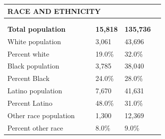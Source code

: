 \documentclass[9pt]{report}
\begin{document}
\vspace{12pt}
\setlength{\tabcolsep}{.01in} %
\begin{tabular}{p{.10in}p{.10in}p{.10in}p{3.7in}>{\hfill}p{.85in}>{\hfill}p{.85in}>{\hfill}p{.85in}>{\hfill}p{.85in}p{0.1in}}
\multicolumn{9}{l}{\parbox{7.1in}{\raggedright{\large{\strut\textbf{RACE AND ETHNICITY}\strut}}}} \\ 
\hline
\multicolumn{4}{l}{\parbox{3.5in}{\raggedright{\textbf{}}}} & \multicolumn{1}{r}{\parbox{.85in}{\strut\raggedleft{\textbf{}\strut}}} & \multicolumn{1}{r}{\parbox{.85in}{\strut\raggedleft{\textbf{}\strut}}} & \multicolumn{1}{r}{\parbox{.85in}{\strut{}}} & \multicolumn{1}{r}{\parbox{.85in}{\strut{}}} & \\ 
\multicolumn{9}{l}{} \\ 
\multicolumn{4}{l}{\parbox{3.5in}{\strut\raggedright{\textbf{Total population}\strut}}} & \textbf{} & \textbf{} & \textbf{15,818} & \textbf{135,736} & \textbf{} \\ 
\multicolumn{4}{l}{\parbox{3.6in}{\strut\raggedright{{White population}}\strut}} &  &  & 3,061 & 43,696 & \multicolumn{1}{l}{}  \\ 
\multicolumn{4}{l}{\parbox{3.6in}{\strut\raggedright{{Percent white}}\strut}} &  &  & 19.0\% & 32.0\% & \multicolumn{1}{l}{}  \\ 
\multicolumn{4}{l}{\parbox{3.6in}{\strut\raggedright{{Black population}}\strut}} &  &  & 3,785 & 38,040 & \multicolumn{1}{l}{}  \\ 
\multicolumn{4}{l}{\parbox{3.6in}{\strut\raggedright{{Percent Black}}\strut}} &  &  & 24.0\% & 28.0\% & \multicolumn{1}{l}{}  \\ 
\multicolumn{4}{l}{\parbox{3.6in}{\strut\raggedright{{Latino population}}\strut}} &  &  & 7,670 & 41,631 & \multicolumn{1}{l}{}  \\ 
\multicolumn{4}{l}{\parbox{3.6in}{\strut\raggedright{{Percent Latino}}\strut}} &  &  & 48.0\% & 31.0\% & \multicolumn{1}{l}{}  \\ 
\multicolumn{4}{l}{\parbox{3.6in}{\strut\raggedright{{Other race population}}\strut}} &  &  & 1,300 & 12,369 & \multicolumn{1}{l}{}  \\ 
\multicolumn{4}{l}{\parbox{3.6in}{\strut\raggedright{{Percent other race}}\strut}} &  &  & 8.0\% & 9.0\% & \multicolumn{1}{l}{}  \\ 

\end{tabular}
\setlength{\tabcolsep}{6pt} %
\end{document}
